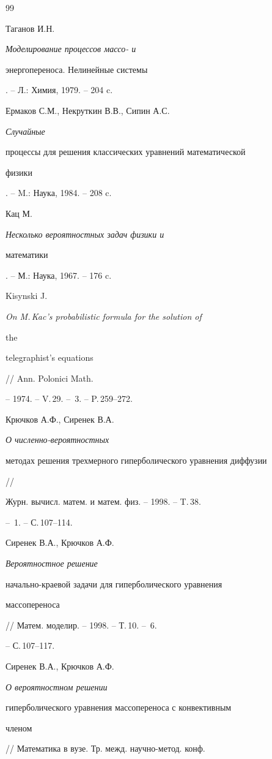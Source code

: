 \begin{thebibliography}{99} 


 




Таганов И.Н. {\em Моделирование процессов массо- и 


энергопереноса. Нелинейные системы}. -- Л.: Химия, 1979. -- 204 c. 




Ермаков С.М., Некруткин В.В., Сипин А.С. {\em Случайные 


процессы для решения классических уравнений математической 


физики}. -- M.: Наука, 1984. -- 208 c. 




Кац М. {\em Несколько вероятностных задач физики и 


математики}. -- М.: Наука, 1967. -- 176 c. 




Kisynski J. {\em On M.\,Kac's probabilistic formula for the solution of 


the 


telegraphist's equations} // Ann. Polonici Math. 


-- 1974. -- V.\,29. -- \No\,3. -- P.\,259--272. 




Крючков А.Ф., Сиренек В.А. {\em О численно-вероятностных 


методах решения трехмерного гиперболического уравнения диффузии} // 


Журн. вычисл. матем. и матем. физ. -- 1998. -- T.\,38. 


-- \No\,1. -- С.\,107--114. 




Сиренек В.А., Крючков А.Ф. {\em Вероятностное решение 


начально-краевой задачи для гиперболического уравнения 


массопереноса} // Матем. моделир. -- 1998. -- Т.\,10. -- \No\,6. 


-- С.\,107--117. 




Сиренек В.А., Крючков А.Ф. {\em О вероятностном решении 


гиперболического уравнения массопереноса с конвективным 


членом} // Математика в вузе. Тр. межд. научно-метод. конф. 



\end{thebibliography}
